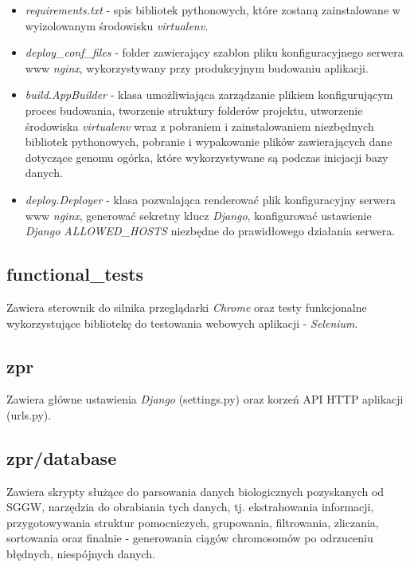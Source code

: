 \begin{itemize}
	\item \textit{requirements.txt} - spis bibliotek pythonowych, które zostaną zainstalowane w wyizolowanym środowisku \textit{virtualenv}.
	
	\item \textit{deploy\_conf\_files} - folder zawierający szablon pliku konfiguracyjnego serwera www \textit{nginx}, wykorzystywany przy produkcyjnym budowaniu aplikacji.
	
	\item \textit{build.AppBuilder} - klasa umożliwiająca zarządzanie plikiem konfigurującym proces budowania, tworzenie struktury folderów projektu, utworzenie środowiska \textit{virtualenv} wraz z pobraniem i zainstalowaniem niezbędnych bibliotek pythonowych, pobranie i wypakowanie plików zawierających dane dotyczące genomu ogórka, które wykorzystywane są podczas inicjacji bazy danych.
	
	\item \textit{deploy.Deployer} - klasa pozwalająca renderować plik konfiguracyjny serwera www \textit{nginx}, generować sekretny klucz \textit{Django}, konfigurować ustawienie \textit{Django ALLOWED\_HOSTS} niezbędne do prawidłowego działania serwera.
\end{itemize}

\subsection*{functional\_tests}
Zawiera sterownik do silnika przeglądarki \textit{Chrome} oraz testy funkcjonalne wykorzystujące bibliotekę do testowania webowych aplikacji - \textit{Selenium}.

\subsection*{zpr}
Zawiera główne ustawienia \textit{Django} (settings.py) oraz korzeń API HTTP aplikacji (urls.py).

\subsection*{zpr/database}
Zawiera skrypty służące do parsowania danych biologicznych pozyskanych od SGGW, narzędzia do obrabiania tych danych, tj. ekstrahowania informacji, przygotowywania struktur pomocniczych, grupowania, filtrowania, zliczania, sortowania oraz finalnie - generowania ciągów chromosomów po odrzuceniu błędnych, niespójnych danych.

